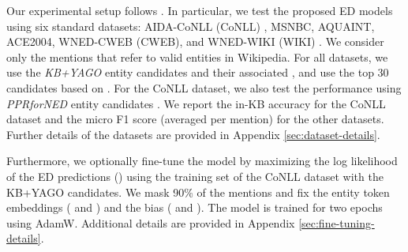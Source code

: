 \documentclass[11pt]{article}
\begin{document}
\begin{table}[tb]
  \centering
  \setlength{\tabcolsep}{2pt}
  \caption{Accuracy on the CoNLL dataset split by the frequency of entity annotations. Our models were fine-tuned using the CoNLL dataset. \textbf{G\&H2017}: The results of .}
  \label{tb:analysis}
\end{table}

Our experimental setup follows .
In particular, we test the proposed ED models using six standard datasets: AIDA-CoNLL (CoNLL) \cite{Hoffart2011}, MSNBC, AQUAINT, ACE2004, WNED-CWEB (CWEB), and WNED-WIKI (WIKI) \cite{guo2018robust}.
We consider only the mentions that refer to valid entities in Wikipedia.
For all datasets, we use the \textit{KB+YAGO} entity candidates and their associated  \cite{ganea-hofmann:2017:EMNLP2017}, and use the top 30 candidates based on .
For the CoNLL dataset, we also test the performance using \textit{PPRforNED} entity candidates \cite{pershina-he-grishman:2015:NAACL-HLT}.
We report the in-KB accuracy for the CoNLL dataset and the micro F1 score (averaged per mention) for the other datasets.
Further details of the datasets are provided in Appendix \ref{sec:dataset-details}.

Furthermore, we optionally fine-tune the model by maximizing the log likelihood of the ED predictions () using the training set of the CoNLL dataset with the KB+YAGO candidates.
We mask 90\% of the mentions and fix the entity token embeddings ( and ) and the bias ( and ).
The model is trained for two epochs using AdamW.
Additional details are provided in Appendix \ref{sec:fine-tuning-details}.
\end{document}
